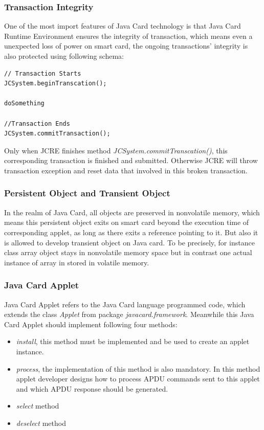 \documentclass[]{llncs}
\begin{document}
\subsubsection{Transaction Integrity}
One of the most import features of Java Card technology is that Java Card Runtime Environment ensures the integrity of transaction, which means even a unexpected loss of power on smart card, the ongoing transactions' integrity is also  protected using  following schema\cite{handbuch}:
\begin{verbatim}
// Transaction Starts
JCSystem.beginTranscation();

doSomething

//Transaction Ends
JCSystem.commitTransaction();
\end{verbatim}
Only when JCRE finishes method \emph{JCSystem.commitTranscation()}, this corresponding transaction is finished and submitted. Otherwise JCRE will throw transaction exception and reset data that involved in this broken transaction.

\subsubsection{Persistent Object and Transient Object}
In  the realm of Java Card, all objects are preserved in nonvolatile memory, which means this persistent object exits on smart card beyond the execution time of corresponding applet, as long as there exits a reference pointing to it. But also it is allowed to develop transient object on Java card. To be precisely, for instance class array object stays in nonvolatile memory space but in contrast one actual instance of array in stored in volatile memory\cite{handbuch}.
\subsubsection{Java Card Applet}
Java Card Applet refers to the Java Card language programmed code, which extends the class \emph{Applet} from package \emph{javacard.framework}. Meanwhile this Java Card Applet should implement following four methods:
\begin{itemize}
\item\emph{install}, this method must be implemented and be used to create an applet instance.
\item\emph{process}, the implementation of this method is also mandatory. In this method applet developer designs how to process APDU commands sent to this applet and which APDU response should be generated.
\item \emph{select} method
\item  \emph{deselect} method
\end{itemize}
\end{document}
